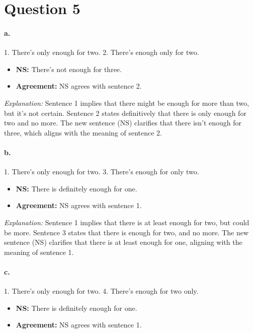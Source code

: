 \documentclass{article}
\begin{document}
\section*{Question 5}

\paragraph{a.}
1. There's only enough for two.
2. There's enough only for two.

\begin{itemize}
    \item \textbf{NS:} There's not enough for three.
    \item \textbf{Agreement:} NS agrees with sentence 2.
\end{itemize}

\textit{Explanation:} Sentence 1 implies that there might be enough for more than two, but it's not certain. Sentence 2 states definitively that there is only enough for two and no more. The new sentence (NS) clarifies that there isn't enough for three, which aligns with the meaning of sentence 2.

\paragraph{b.}
1. There's only enough for two.
3. There's enough for only two.

\begin{itemize}
    \item \textbf{NS:}  There is definitely enough for one.
    \item \textbf{Agreement:} NS agrees with sentence 1.
\end{itemize}

\textit{Explanation:} Sentence 1 implies that there is at least enough for two, but could be more. Sentence 3 states that there is enough for two, and no more. The new sentence (NS) clarifies that there is at least enough for one, aligning with the meaning of sentence 1.

\paragraph{c.}
1. There's only enough for two.
4. There's enough for two only.

\begin{itemize}
    \item \textbf{NS:} There is definitely enough for one.
    \item \textbf{Agreement:} NS agrees with sentence 1.
\end{itemize}
\end{document}
